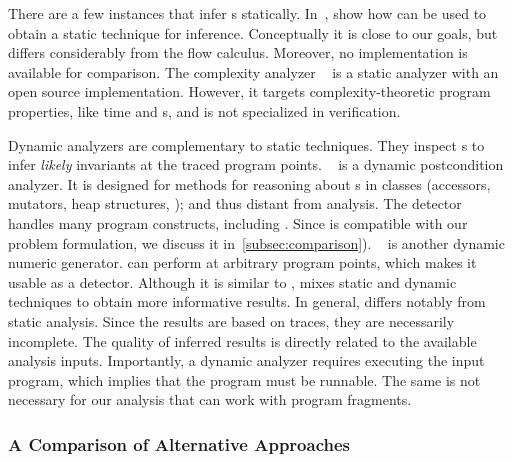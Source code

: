 There are a few instances that infer s statically.
In~\cite{popeea2006}, show how  can be used to
obtain a static technique for  inference. Conceptually it is
close to our goals, but  differs considerably from
the flow calculus. Moreover, no implementation is available
for comparison. The complexity analyzer ~\cite{giesl2022} is a static
analyzer with an open source implementation. However, it targets
complexity-theoretic program properties, like time and s, and is
not specialized in verification.

Dynamic analyzers are complementary to static techniques. They inspect s to infer \emph{likely}
invariants at the traced program points.
~\cite{molina2021} is a dynamic postcondition analyzer. It is
designed for  methods for reasoning about s in
classes (accessors, mutators, heap structures, \etc); and thus distant from
 analysis. The  detector
~\cite{ernst2007} handles many program constructs, including
. Since  is compatible with our problem
formulation, we discuss it in~\autoref{subsec:comparison}).
~\cite{nguyen2014} is another dynamic numeric 
generator.  can perform  at arbitrary program
points, which makes it usable as a  detector. Although it is
similar to ,  mixes static and dynamic techniques to obtain
more informative results. In general,  differs
notably from static analysis. Since the results are based on
traces, they are necessarily
incomplete. The quality of inferred results is directly
related to the available analysis inputs. Importantly, a dynamic analyzer
requires executing the input program, which implies that the program must be
runnable. The same is not necessary for our analysis that can work with program
fragments.

\subsubsection{A Comparison of Alternative Approaches}
\label{subsec:comparison}

